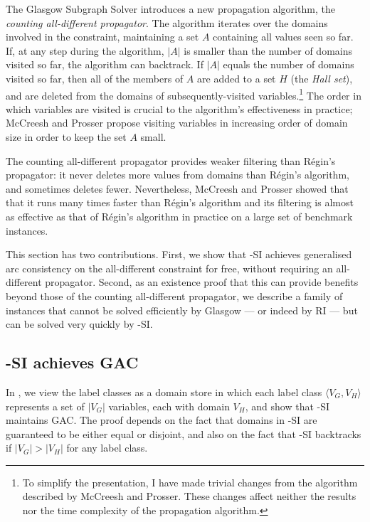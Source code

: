 The Glasgow Subgraph Solver \cite{DBLP:conf/cp/McCreeshP15} introduces a new propagation algorithm,
the \emph{counting all-different propagator}.
The algorithm iterates over the domains involved in the constraint, maintaining a set $A$ containing
all values seen so far.  If, at any step during the algorithm, $|A|$ is smaller than the number
of domains visited so far, the algorithm can backtrack.  If $|A|$ equals the number of domains visited
so far, then all of the members of $A$ are added to a set $H$ (the \emph{Hall set}), and are deleted from
the domains of subsequently-visited variables.\footnote{To simplify the presentation,
I have made trivial changes from the algorithm described by McCreesh and Prosser.
These changes affect neither the results nor the time complexity of the propagation algorithm.}
The order in which variables are visited is crucial
to the algorithm's effectiveness in practice; McCreesh and Prosser
propose visiting variables in increasing order of domain size in order to keep the set $A$ small.

The counting all-different propagator provides weaker filtering than
R\'egin's propagator: it never deletes more values from domains than R\'egin's algorithm, and sometimes
deletes fewer. Nevertheless, McCreesh and Prosser showed that that it runs many times faster than
R\'egin's algorithm and its filtering is almost as effective as that of R\'egin's algorithm in practice
on a large set of benchmark instances.

This section has two contributions. First, we show that \McSplit-SI achieves generalised arc consistency
on the all-different constraint for free, without requiring an all-different propagator.
Second, as an existence proof that this can provide benefits beyond those of the counting all-different
propagator, we describe
a family of instances that cannot be solved efficiently by Glasgow --- or indeed by RI --- but can
be solved very quickly by \McSplit-SI.

\subsection{\McSplit-SI achieves GAC}

In , we view the label classes as a domain store in which each label
class $\langle V_G, V_H \rangle$ represents a set of $|V_G|$ variables, each with domain $V_H$,
and show that \McSplit-SI maintains GAC.  The proof depends on the fact that domains in
\McSplit-SI are guaranteed to be
either equal or disjoint, and also on the fact that \McSplit-SI backtracks if $|V_G| > |V_H|$
for any label class.

